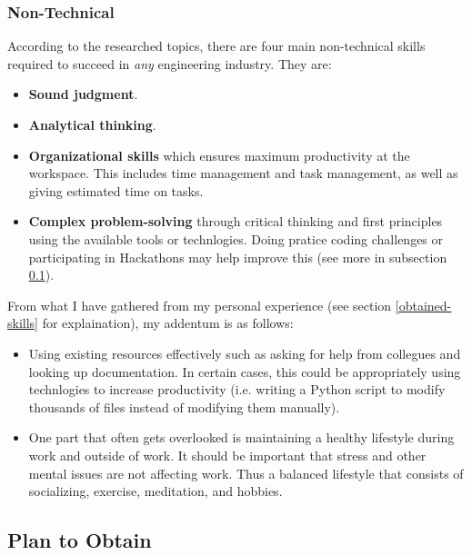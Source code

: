 \documentclass[10pt,letterpaper]{article}
\begin{document}
\subsubsection{Non-Technical}

According to the researched topics, there are four main non-technical skills required to succeed in \textit{any} engineering industry. They are:\\

\begin{itemize}
	\item 
	\textbf{Sound judgment}.

	\item
	\textbf{Analytical thinking}.

	\item
	\textbf{Organizational skills} which ensures maximum productivity at the workspace. This includes time management and task management, as well as giving estimated time on tasks.

	\item
	\textbf{Complex problem-solving} through critical thinking and first principles using the available tools or technlogies. Doing pratice coding challenges or participating in Hackathons may help improve this (see more in subsection \ref{plan-to-obtain}).
\end{itemize}

From what I have gathered from my personal experience (see section \ref{obtained-skills} for explaination), my addentum is as follows:\\

\begin{itemize}
	\item Using existing resources effectively such as asking for help from collegues and looking up documentation. In certain cases, this could be appropriately using technlogies to increase productivity (i.e. writing a Python script to modify thousands of files instead of modifying them manually).

	\item One part that often gets overlooked is maintaining a healthy lifestyle during work and outside of work. It should be important that stress and other mental issues are not affecting work. Thus a balanced lifestyle that consists of socializing, exercise, meditation, and hobbies.
\end{itemize}

\subsection{Plan to Obtain}\label{plan-to-obtain}
\end{document}
